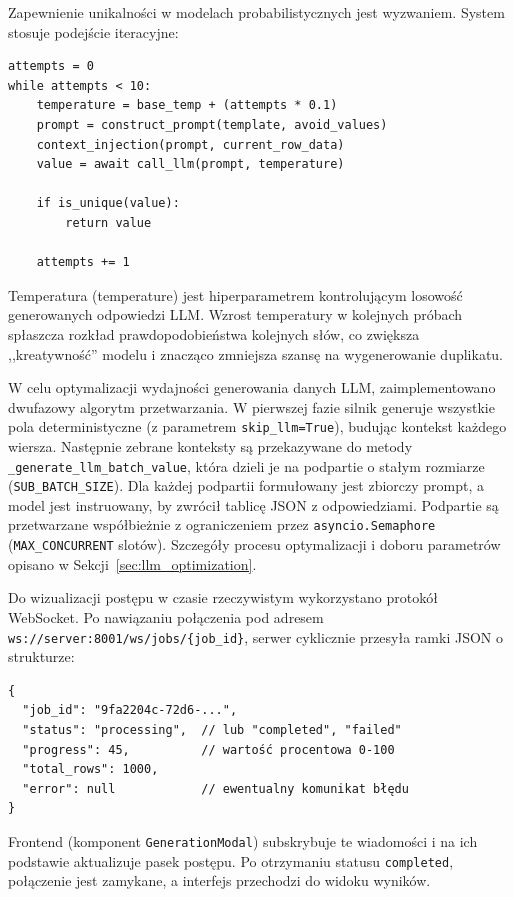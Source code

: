 Zapewnienie unikalności w modelach probabilistycznych jest wyzwaniem. System stosuje podejście iteracyjne:
\begin{verbatim}
attempts = 0
while attempts < 10:
    temperature = base_temp + (attempts * 0.1)
    prompt = construct_prompt(template, avoid_values)
    context_injection(prompt, current_row_data)
    value = await call_llm(prompt, temperature)
    
    if is_unique(value):
        return value
    
    attempts += 1
\end{verbatim}
Temperatura (temperature) jest hiperparametrem kontrolującym losowość generowanych odpowiedzi \gls{LLM}. Wzrost temperatury w kolejnych próbach spłaszcza rozkład prawdopodobieństwa kolejnych słów, co zwiększa ,,kreatywność'' modelu i znacząco zmniejsza szansę na wygenerowanie duplikatu.

W celu optymalizacji wydajności generowania danych \gls{LLM}, zaimplementowano dwufazowy algorytm przetwarzania. W pierwszej fazie silnik generuje wszystkie pola deterministyczne (z parametrem \texttt{skip\_llm=True}), budując kontekst każdego wiersza. Następnie zebrane konteksty są przekazywane do metody \texttt{\_generate\_llm\_batch\_value}, która dzieli je na podpartie o stałym rozmiarze (\texttt{SUB\_BATCH\_SIZE}). Dla każdej podpartii formułowany jest zbiorczy prompt, a model jest instruowany, by zwrócił tablicę \gls{JSON} z odpowiedziami. Podpartie są przetwarzane współbieżnie z ograniczeniem przez \texttt{asyncio.Semaphore} (\texttt{MAX\_CONCURRENT} slotów). Szczegóły procesu optymalizacji i doboru parametrów opisano w Sekcji~\ref{sec:llm_optimization}.

Do wizualizacji postępu w czasie rzeczywistym wykorzystano protokół WebSocket. Po nawiązaniu połączenia pod adresem \texttt{ws://server:8001/ws/jobs/\{job\_id\}}, serwer cyklicznie przesyła ramki \gls{JSON} o strukturze:

\begin{verbatim}
{
  "job_id": "9fa2204c-72d6-...",
  "status": "processing",  // lub "completed", "failed"
  "progress": 45,          // wartość procentowa 0-100
  "total_rows": 1000,
  "error": null            // ewentualny komunikat błędu
}
\end{verbatim}

Frontend (komponent \texttt{GenerationModal}) subskrybuje te wiadomości i na ich podstawie aktualizuje pasek postępu. Po otrzymaniu statusu \texttt{completed}, połączenie jest zamykane, a interfejs przechodzi do widoku wyników.

